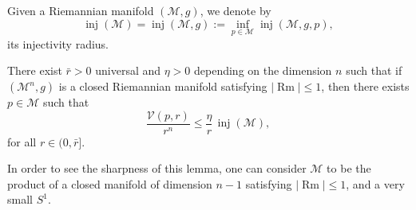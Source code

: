 Given a Riemannian manifold $(\mathcal M,g)$, we denote by
\[
\operatorname{inj}(\mathcal M) = \operatorname{inj}(\mathcal M, g) := \inf_{p \in \mathcal M} \operatorname{inj}(\mathcal M, g, p),
\]
its injectivity radius.

\begin{lemma}
\label{topping-ch8-volume-ratio-inj-estimate}
There exist $\bar r > 0$ universal and $\eta > 0$ depending on the dimension
$n$ such that if $(\mathcal M^n, g)$ is a closed Riemannian manifold
satisfying $|\operatorname{Rm}| \le 1$, then there exists $p \in \mathcal M$
such that
\[
\frac{\mathcal V(p,r)}{r^n} \le \frac{\eta}{r}\,\operatorname{inj}(\mathcal M),
\]
for all $r \in (0,\bar r]$.
\end{lemma}

In order to see the sharpness of this lemma, one can consider $\mathcal M$ to
be the product of a closed manifold of dimension $n-1$ satisfying
$|\operatorname{Rm}| \le 1$, and a very small $S^1$.


